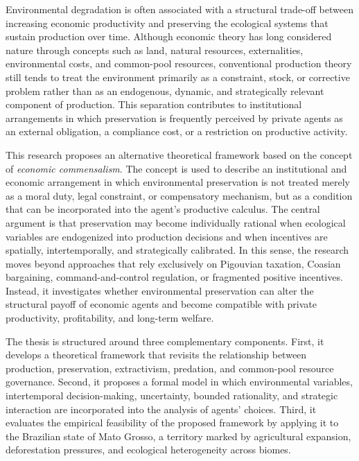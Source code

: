 

Environmental degradation is often associated with a structural trade-off between increasing economic productivity and preserving the ecological systems that sustain production over time. Although economic theory has long considered nature through concepts such as land, natural resources, externalities, environmental costs, and common-pool resources, conventional production theory still tends to treat the environment primarily as a constraint, stock, or corrective problem rather than as an endogenous, dynamic, and strategically relevant component of production. This separation contributes to institutional arrangements in which preservation is frequently perceived by private agents as an external obligation, a compliance cost, or a restriction on productive activity.

This research proposes an alternative theoretical framework based on the concept of \emph{economic commensalism}. The concept is used to describe an institutional and economic arrangement in which environmental preservation is not treated merely as a moral duty, legal constraint, or compensatory mechanism, but as a condition that can be incorporated into the agent's productive calculus. The central argument is that preservation may become individually rational when ecological variables are endogenized into production decisions and when incentives are spatially, intertemporally, and strategically calibrated. In this sense, the research moves beyond approaches that rely exclusively on Pigouvian taxation, Coasian bargaining, command-and-control regulation, or fragmented positive incentives. Instead, it investigates whether environmental preservation can alter the structural payoff of economic agents and become compatible with private productivity, profitability, and long-term welfare.

The thesis is structured around three complementary components. First, it develops a theoretical framework that revisits the relationship between production, preservation, extractivism, predation, and common-pool resource governance. Second, it proposes a formal model in which environmental variables, intertemporal decision-making, uncertainty, bounded rationality, and strategic interaction are incorporated into the analysis of agents' choices. Third, it evaluates the empirical feasibility of the proposed framework by applying it to the Brazilian state of Mato Grosso, a territory marked by agricultural expansion, deforestation pressures, and ecological heterogeneity across biomes.


